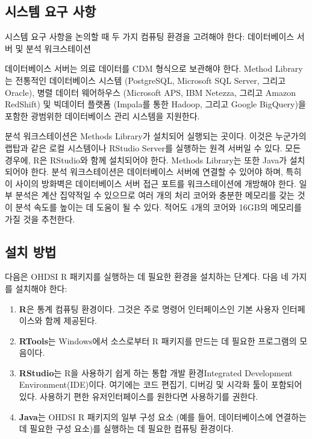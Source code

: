 \documentclass[10.5pt]{book}
\providecommand{\tightlist}{%
  \setlength{\itemsep}{0pt}\setlength{\parskip}{0pt}}
\theoremstyle{definition}
\theoremstyle{definition}
\theoremstyle{definition}
\theoremstyle{remark}
\begin{document}
\subsection{시스템 요구 사항}\label{--}

시스템 요구 사항을 논의할 때 두 가지 컴퓨팅 환경을 고려해야 한다:
데이터베이스 서버 및 분석 워크스테이션 

데이터베이스 서버는 의료 데이터를 CDM 형식으로 보관해야 한다. Method
Library는 전통적인 데이터베이스 시스템 (PostgreSQL, Microsoft SQL
Server, 그리고 Oracle), 병렬 데이터 웨어하우스 (Microsoft APS, IBM
Netezza, 그리고 Amazon RedShift) 및 빅데이터 플랫폼 (Impala를 통한
Hadoop, 그리고 Google BigQuery)을 포함한 광범위한 데이터베이스 관리
시스템을 지원한다.

분석 워크스테이션은 Methods Library가 설치되어 실행되는 곳이다. 이것은
누군가의 랩탑과 같은 로컬 시스템이나 RStudio Server를 실행하는 원격
서버일 수 있다. 모든 경우에, R은 RStudio와 함께 설치되어야 한다. Methods
Library는 또한 Java가 설치되어야 한다. 분석 워크스테이션은 데이터베이스
서버에 연결할 수 있어야 하며, 특히 이 사이의 방화벽은 데이터베이스 서버
접근 포트를 워크스테이션에 개방해야 한다. 일부 분석은 계산 집약적일 수
있으므로 여러 개의 처리 코어와 충분한 메모리를 갖는 것이 분석 속도를
높이는 데 도움이 될 수 있다. 적어도 4개의 코어와 16GB의 메모리를 가질
것을 추천한다.

\subsection{설치 방법}\label{installR}

다음은 OHDSI R 패키지를 실행하는 데 필요한 환경을 설치하는 단계다. 다음
네 가지를 설치해야 한다: 

\begin{enumerate}
\def\labelenumi{\arabic{enumi}.}
\tightlist
\item
  \textbf{R}은 통계 컴퓨팅 환경이다. 그것은 주로 명령어 인터페이스인
  기본 사용자 인터페이스와 함께 제공된다.
\item
  \textbf{RTools}는 Windows에서 소스로부터 R 패키지를 만드는 데 필요한
  프로그램의 모음이다.
\item
  \textbf{RStudio}는 R을 사용하기 쉽게 하는 통합 개발 환경Integrated
  Development Environment(IDE)이다. 여기에는 코드 편집기, 디버깅 및
  시각화 툴이 포함되어 있다. 사용하기 편한 유저인터페이스를 원한다면
  사용하기를 권한다.
\item
  \textbf{Java}는 OHDSI R 패키지의 일부 구성 요소 (예를 들어,
  데이터베이스에 연결하는 데 필요한 구성 요소)를 실행하는 데 필요한
  컴퓨팅 환경이다.
\end{enumerate}
\end{document}
